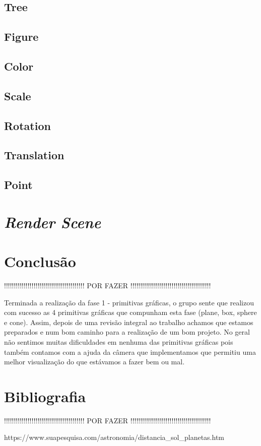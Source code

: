 \documentclass[a4paper]{article}
\begin{document}
\subsection{Tree}
\label{sec:tree}

\subsection{Figure}
\label{sec:figure}

\subsection{Color}
\label{sec:color}

\subsection{Scale}
\label{sec:scale}

\subsection{Rotation}
\label{sec:rotation}

\subsection{Translation}
\label{sec:translation}

\subsection{Point}
\label{sec:point}


\newpage

\section{\textit{Render Scene}}


\newpage

\section{Conclusão}
\label{sec:conclusao}

!!!!!!!!!!!!!!!!!!!!!!!!!!!!!!!!!!!!!!!!! POR FAZER !!!!!!!!!!!!!!!!!!!!!!!!!!!!!!!!!!!!!!!!!

Terminada a realização da fase 1 - primitivas gráficas, o grupo sente que realizou com sucesso  as 4 primitivas gráficas que compunham esta fase (plane, box, sphere e cone).  Assim, depois de uma revisão integral ao trabalho achamos que estamos preparados e num bom caminho para a realização de um bom projeto.
No geral não sentimos muitas dificuldades em nenhuma das primitivas gráficas pois também contamos com a ajuda da câmera que implementamos que permitiu uma melhor visualização do que estávamos a fazer bem ou mal.


\section{Bibliografia}
\label{sec:bibliografia}

!!!!!!!!!!!!!!!!!!!!!!!!!!!!!!!!!!!!!!!!! POR FAZER !!!!!!!!!!!!!!!!!!!!!!!!!!!!!!!!!!!!!!!!!

https://www.suapesquisa.com/astronomia/distancia_sol_planetas.htm
\end{document}
